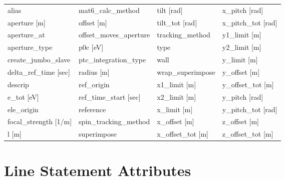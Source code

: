  \begin{tabular}{llll} \toprule
alias                            & mat6_calc_method                 & tilt [rad]                       & x_pitch [rad]                    \\
aperture [m]                     & offset [m]                       & tilt_tot [rad]                   & x_pitch_tot [rad]                \\
aperture_at                      & offset_moves_aperture            & tracking_method                  & y1_limit [m]                     \\
aperture_type                    & p0c [eV]                         & type                             & y2_limit [m]                     \\
create_jumbo_slave               & ptc_integration_type             & wall                             & y_limit [m]                      \\
delta_ref_time [sec]             & radius [m]                       & wrap_superimpose                 & y_offset [m]                     \\
descrip                          & ref_origin                       & x1_limit [m]                     & y_offset_tot [m]                 \\
e_tot [eV]                       & ref_time_start [sec]             & x2_limit [m]                     & y_pitch [rad]                    \\
ele_origin                       & reference                        & x_limit [m]                      & y_pitch_tot [rad]                \\
focal_strength [1/m]             & spin_tracking_method             & x_offset [m]                     & z_offset [m]                     \\
l [m]                            & superimpose                      & x_offset_tot [m]                 & z_offset_tot [m]                 \\
 \bottomrule
 \end{tabular}
 \vfill
 
 \section{Line Statement Attributes}
 \label{s:list.line}
 
